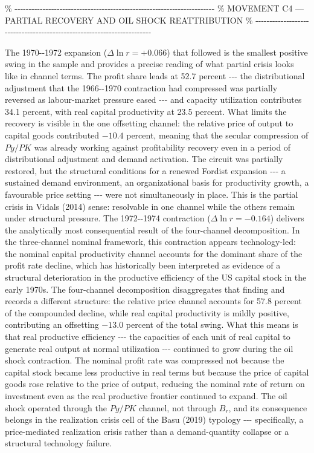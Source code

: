 \%
-\/-\/-\/-\/-\/-\/-\/-\/-\/-\/-\/-\/-\/-\/-\/-\/-\/-\/-\/-\/-\/-\/-\/-\/-\/-\/-\/-\/-\/-\/-\/-\/-\/-\/-\/-\/-\/-\/-\/-\/-\/-\/-\/-\/-\/-\/-\/-\/-\/-\/-\/-\/-\/-\/-\/-\/-\/-\/-\/-\/-\/-\/-\/-\/-\/-\/-\/-\/-\/-\/-
\% MOVEMENT C4 --- PARTIAL RECOVERY AND OIL SHOCK REATTRIBUTION \%
-\/-\/-\/-\/-\/-\/-\/-\/-\/-\/-\/-\/-\/-\/-\/-\/-\/-\/-\/-\/-\/-\/-\/-\/-\/-\/-\/-\/-\/-\/-\/-\/-\/-\/-\/-\/-\/-\/-\/-\/-\/-\/-\/-\/-\/-\/-\/-\/-\/-\/-\/-\/-\/-\/-\/-\/-\/-\/-\/-\/-\/-\/-\/-\/-\/-\/-\/-\/-\/-\/-

The 1970-\/-1972 expansion (\(\Delta\ln r = +0.066\)) that followed is
the smallest positive swing in the sample and provides a precise reading
of what partial crisis looks like in channel terms. The profit share
leads at 52.7 percent -\/-\/- the distributional adjustment that the
1966-\/-1970 contraction had compressed was partially reversed as
labour-market pressure eased -\/-\/- and capacity utilization
contributes 34.1 percent, with real capital productivity at 23.5
percent. What limits the recovery is visible in the one offsetting
channel: the relative price of output to capital goods contributed
\(-10.4\) percent, meaning that the secular compression of \(Py/PK\) was
already working against profitability recovery even in a period of
distributional adjustment and demand activation. The circuit was
partially restored, but the structural conditions for a renewed Fordist
expansion -\/-\/- a sustained demand environment, an organizational
basis for productivity growth, a favourable price setting -\/-\/- were
not simultaneously in place. This is the partial crisis in
Vidal\textquotesingle s (2014) sense: resolvable in one channel while
the others remain under structural pressure. The 1972-\/-1974
contraction (\(\Delta\ln r =
-0.164\)) delivers the analytically most consequential result of the
four-channel decomposition. In the three-channel nominal framework, this
contraction appears technology-led: the nominal capital productivity
channel accounts for the dominant share of the profit rate decline,
which has historically been interpreted as evidence of a structural
deterioration in the productive efficiency of the US capital stock in
the early 1970s. The four-channel decomposition disaggregates that
finding and records a different structure: the relative price channel
accounts for 57.8 percent of the compounded decline, while real capital
productivity is mildly positive, contributing an offsetting \(-13.0\)
percent of the total swing. What this means is that real productive
efficiency -\/-\/- the capacities of each unit of real capital to
generate real output at normal utilization -\/-\/- continued to grow
during the oil shock contraction. The nominal profit rate was compressed
not because the capital stock became less productive in real terms but
because the price of capital goods rose relative to the price of output,
reducing the nominal rate of return on investment even as the real
productive frontier continued to expand. The oil shock operated through
the \(Py/PK\) channel, not through \(B_{r}\), and its consequence
belongs in the realization crisis cell of the Basu (2019) typology
-\/-\/- specifically, a price-mediated realization crisis rather than a
demand-quantity collapse or a structural technology failure.

